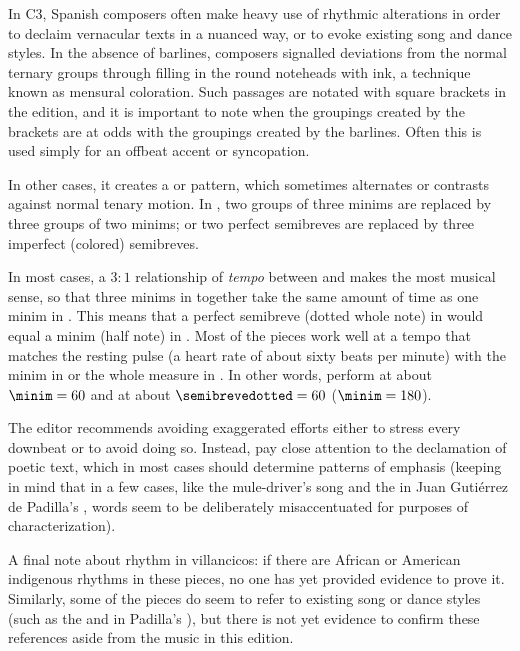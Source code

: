 In C3, Spanish composers often make heavy use of rhythmic alterations in
order to declaim vernacular texts in a nuanced way, or to evoke existing
song and dance styles.
In the absence of barlines, composers signalled deviations from the normal
ternary groups through filling in the round noteheads with ink, a technique
known as mensural coloration.
Such passages are notated with square brackets in the edition, and it is
important to note when the groupings created by the brackets are at odds
with the groupings created by the barlines.
Often this is used simply for an offbeat accent or syncopation.

In other cases, it creates a  or  pattern,
which sometimes alternates or contrasts against normal tenary motion.
In , two groups of three minims are replaced by three
groups of two minims; or two perfect semibreves are replaced by three
imperfect (colored) semibreves.


In most cases, a $3:1$ relationship of \emph{tempo} between \meterCThree{}
and \meterC{} makes the most musical sense, so that three minims in
\meterCZ{} together take the same amount of time as one minim in \meterC{}.
This means that a perfect semibreve (dotted whole note) in \meterCThree{}
would equal a minim (half note) in \meterC{}.
Most of the pieces work well at a tempo that matches the resting pulse 
(a heart rate of about sixty beats per minute) with the minim in \meterC{}
or the whole measure in \meterCThree{}.
In other words, perform \meterC{} at about $\minim = 60$ and \meterCThree{}
at about $\semibrevedotted = 60$ ($\minim = 180$).

The editor recommends avoiding exaggerated efforts either to stress every
downbeat or to avoid doing so.
Instead, pay close attention to the declamation of poetic text, which in
most cases should determine patterns of emphasis (keeping in mind that in a
few cases, like the mule-driver's song and the  in Juan
Gutiérrez de Padilla's , words seem to be
deliberately misaccentuated for purposes of characterization).

A final note about rhythm in villancicos: if there are African or American
indigenous rhythms in these pieces, no one has yet provided evidence to prove
it.
Similarly, some of the pieces do seem to refer to existing song or dance styles
(such as the  and  in Padilla's
), but there is not yet evidence to confirm these
references aside from the music in this edition.





